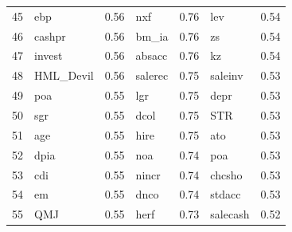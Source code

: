 \begin{footnotesize}
\begin{longtable}{rlc|lc|lc}
		45                        & ebp                         & 0.56                          & nxf                         & 0.76                          & lev                               & 0.54           \\
		46                        & cashpr                      & 0.56                          & bm\_ia                      & 0.76                          & zs                                & 0.54           \\
		47                        & invest                      & 0.56                          & absacc                      & 0.76                          & kz                                & 0.54           \\
		48                        & HML\_Devil                  & 0.56                          & salerec                     & 0.75                          & saleinv                           & 0.53           \\
		49                        & poa                         & 0.55                          & lgr                         & 0.75                          & depr                              & 0.53           \\
		50                        & sgr                         & 0.55                          & dcol                        & 0.75                          & STR                               & 0.53           \\
		51                        & age                         & 0.55                          & hire                        & 0.75                          & ato                               & 0.53           \\
		52                        & dpia                        & 0.55                          & noa                         & 0.74                          & poa                               & 0.53           \\
		53                        & cdi                         & 0.55                          & nincr                       & 0.74                          & chcsho                            & 0.53           \\
		54                        & em                          & 0.55                          & dnco                        & 0.74                          & stdacc                            & 0.53           \\
		55                        & QMJ                         & 0.55                          & herf                        & 0.73                          & salecash                          & 0.52           \\

\end{longtable}
\end{footnotesize}
